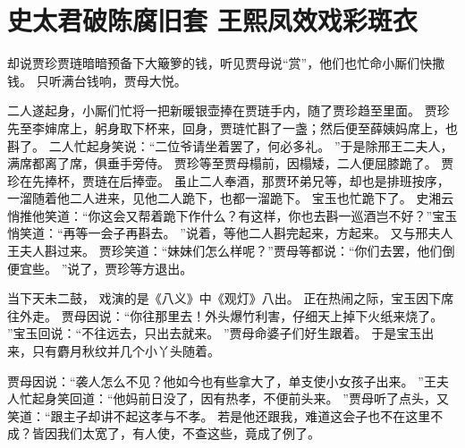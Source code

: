 \chapter{史太君破陈腐旧套 \quad 王熙凤效戏彩斑衣}
\par
{}\par
却说贾珍贾琏暗暗预备下大簸箩的钱，听见贾母说“赏”，他们也忙命小厮们快撒钱。
只听满台钱响，贾母大悦。
\par
二人遂起身，小厮们忙将一把新暖银壶捧在贾琏手内，随了贾珍趋至里面。
贾珍先至李婶席上，躬身取下杯来，回身，贾琏忙斟了一盏；然后便至薛姨妈席上，也斟了。
二人忙起身笑说：“二位爷请坐着罢了，何必多礼。
”于是除邢王二夫人，满席都离了席，俱垂手旁侍。
贾珍等至贾母榻前，因榻矮，二人便屈膝跪了。
贾珍在先捧杯，贾琏在后捧壶。
虽止二人奉酒，那贾环弟兄等，却也是排班按序，一溜随着他二人进来，见他二人跪下，也都一溜跪下。
宝玉也忙跪下了。
史湘云悄推他笑道：“你这会又帮着跪下作什么？有这样，你也去斟一巡酒岂不好？”宝玉悄笑道：“再等一会子再斟去。
”说着，等他二人斟完起来，方起来。
又与邢夫人王夫人斟过来。
贾珍笑道：“妹妹们怎么样呢？”贾母等都说：“你们去罢，他们倒便宜些。
”说了，贾珍等方退出。
\par
当下天未二鼓，
戏演的是《八义》中《观灯》八出。
正在热闹之际，宝玉因下席往外走。
贾母因说：“你往那里去！外头爆竹利害，仔细天上掉下火纸来烧了。
”宝玉回说：“不往远去，只出去就来。
”贾母命婆子们好生跟着。
于是宝玉出来，只有麝月秋纹并几个小丫头随着。
\par
贾母因说：“袭人怎么不见？他如今也有些拿大了，单支使小女孩子出来。
”王夫人忙起身笑回道：“他妈前日没了，因有热孝，不便前头来。
”贾母听了点头，又笑道：“跟主子却讲不起这孝与不孝。
若是他还跟我，难道这会子也不在这里不成？皆因我们太宽了，有人使，不查这些，竟成了例了。
